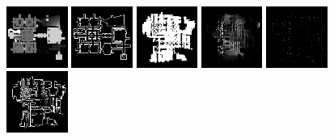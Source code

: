 \begin{figure}[h!]
\begin{minipage}[b]{\linewidth}
	\begin{center}
		\includegraphics[width=2cm]{figures/results/samples/cond/sample1_map_heightmap_true.png}
		\includegraphics[width=2cm]{figures/results/samples/cond/sample1_map_wallmap_true.png}
		\hfill 
		\includegraphics[width=2cm]{figures/results/samples/cond/sample1_map_floormap_generated.png}
		\includegraphics[width=2cm]{figures/results/samples/cond/sample1_map_heightmap_generated.png}
		\includegraphics[width=2cm]{figures/results/samples/cond/sample1_map_thingsmap_generated.png}
		\includegraphics[width=2cm]{figures/results/samples/cond/sample1_map_wallmap_generated.png}
	\end{center}
	

\end{minipage}
\end{figure}
